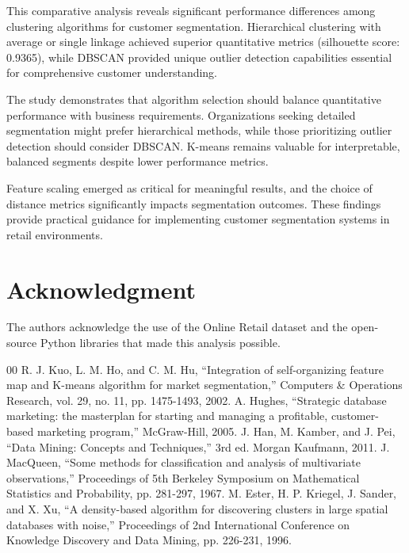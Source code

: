 \documentclass[conference]{IEEEtran}
\begin{document}
This comparative analysis reveals significant performance differences among clustering algorithms for customer segmentation. Hierarchical clustering with average or single linkage achieved superior quantitative metrics (silhouette score: 0.9365), while DBSCAN provided unique outlier detection capabilities essential for comprehensive customer understanding.

The study demonstrates that algorithm selection should balance quantitative performance with business requirements. Organizations seeking detailed segmentation might prefer hierarchical methods, while those prioritizing outlier detection should consider DBSCAN. K-means remains valuable for interpretable, balanced segments despite lower performance metrics.

Feature scaling emerged as critical for meaningful results, and the choice of distance metrics significantly impacts segmentation outcomes. These findings provide practical guidance for implementing customer segmentation systems in retail environments.

\section*{Acknowledgment}

The authors acknowledge the use of the Online Retail dataset and the open-source Python libraries that made this analysis possible.

\begin{thebibliography}{00}
 R. J. Kuo, L. M. Ho, and C. M. Hu, ``Integration of self-organizing feature map and K-means algorithm for market segmentation,'' Computers \& Operations Research, vol. 29, no. 11, pp. 1475-1493, 2002.
 A. Hughes, ``Strategic database marketing: the masterplan for starting and managing a profitable, customer-based marketing program,'' McGraw-Hill, 2005.
 J. Han, M. Kamber, and J. Pei, ``Data Mining: Concepts and Techniques,'' 3rd ed. Morgan Kaufmann, 2011.
 J. MacQueen, ``Some methods for classification and analysis of multivariate observations,'' Proceedings of 5th Berkeley Symposium on Mathematical Statistics and Probability, pp. 281-297, 1967.
 M. Ester, H. P. Kriegel, J. Sander, and X. Xu, ``A density-based algorithm for discovering clusters in large spatial databases with noise,'' Proceedings of 2nd International Conference on Knowledge Discovery and Data Mining, pp. 226-231, 1996.
\end{thebibliography}
\end{document}
